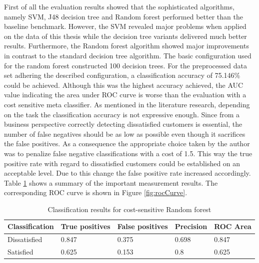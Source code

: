 First of all the evaluation results showed that the sophisticated algorithms, namely SVM, J48 decision tree and Random forest performed better than the baseline benchmark. However, the SVM revealed major problems when applied on the data of this thesis while the decision tree variants delivered much better results. Furthermore, the Random forest algorithm showed major improvements in contrast to the standard decision tree algorithm. The basic configuration used for the random forest constructed 100 decision trees. For the preprocessed data set adhering the described configuration, a classification accuracy of 75.146\% could be achieved. Although this was the highest accuracy achieved, the AUC value indicating the area under ROC curve is worse than the evaluation with a cost sensitive meta classifier. As mentioned in the literature research, depending on the task the classification accuracy is not expressive enough. Since from a business perspective correctly detecting dissatisfied customers is essential, the number of false negatives should be as low as possible even though it sacrifices the false positives. As a consequence the appropriate choice taken by the author was to penalize false negative classifications with a cost of 1.5. This way the true positive rate with regard to dissatisfied customers could be established on an acceptable level. Due to this change the false positive rate increased accordingly. Table \ref{tab:classificationResults} shows a summary of the important measurement results. The corresponding ROC curve is shown in Figure \ref{fig:rocCurve}. 

\begin{table}[]
	\centering
	\begin{tabular}{|l|l|l|l|l|}
		\hline
		\textbf{Classification} & \textbf{True positives} & \textbf{False positives} & \textbf{Precision} & \textbf{ROC Area} \\ \hline
		Dissatisfied            & 0.847                   & 0.375                    & 0.698              & 0.847             \\ \hline
		Satisfied               & 0.625                   & 0.153                    & 0.8                & 0.625             \\ \hline
	\end{tabular}
 	\caption{Classification results for cost-sensitive Random forest}
 	\label{tab:classificationResults}
 \end{table}

